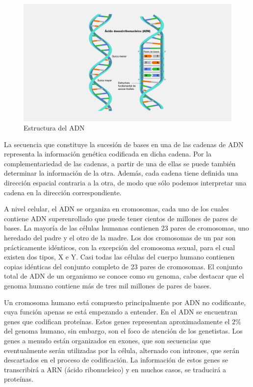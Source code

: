 \begin{figure}[H]
    \centering
    \includegraphics[width=\textwidth]{img/Estructura_del_ADN.jpg}
    \caption{Estructura del ADN \cite{genome}}
\end{figure}

La secuencia que constituye la sucesión de bases en una de las cadenas de ADN representa la información genética codificada en dicha cadena. Por la complementariedad de las cadenas, a partir de una de ellas se puede también determinar la información de la otra. Además, cada cadena tiene definida una dirección espacial contraria a la otra, de modo que sólo podemos interpretar una cadena en la dirección correspondiente.

A nivel celular, el ADN se organiza en cromosomas, cada uno de los cuales contiene ADN superenrollado que puede tener cientos de millones de pares de bases. La mayoría de las células humanas contienen 23 pares de cromosomas, uno heredado del padre y el otro de la madre. Los dos cromosomas de un par son prácticamente idénticos, con la excepción del cromosoma sexual, para el cual existen dos tipos, X e Y. Casi todas las células del cuerpo humano contienen copias idénticas del conjunto completo de 23 pares de cromosomas. El conjunto total de ADN de un organismo se conoce como su genoma, cabe destacar que el genoma humano contiene más de tres mil millones de pares de bases.

Un cromosoma humano está compuesto principalmente por ADN no codificante, cuya función apenas se está empezando a entender. En el ADN se encuentran genes que codifican proteínas. Estos genes representan aproximadamente el $2\%$ del genoma humano, sin embargo, son el foco de atención de los genetistas. Los genes a menudo están organizados en exones, que son secuencias que eventualmente serán utilizadas por la célula, alternado con intrones, que serán descartados en el proceso de codificación. La información de estos genes se transcribirá a ARN (ácido ribonucleico) y en muchos casos, se traducirá a proteínas.


